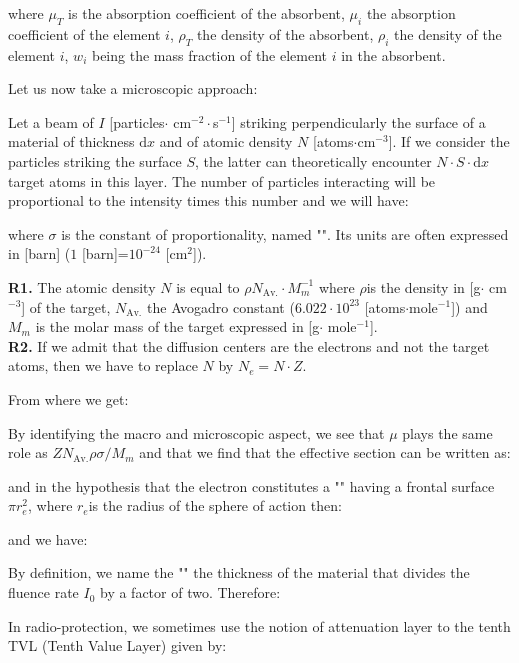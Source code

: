 	where $\mu_T$ is the absorption coefficient of the absorbent, $\mu_i$ the absorption coefficient of the element $i$, $\rho_T$ the density of the absorbent, $\rho_i$ the density of the element $i$, $w_i$ being the mass fraction of the element $i$ in the absorbent.

	Let us now take a microscopic approach:
	
	Let a beam of $I$ [particles$\cdot$ cm$^{-2}\cdot$s$^{-1}$] striking perpendicularly the surface of a material of thickness $\mathrm{d}x$ and of atomic density $N$ [atoms$\cdot$cm$^{-3}$]. If we consider the particles striking the surface $S$, the latter can theoretically encounter $N\cdot S\cdot \mathrm{d}x$ target atoms in this layer. The number of particles interacting will be proportional to the intensity times this number and we will have:
	
	where $\sigma$ is the constant of proportionality, named "". Its units are often expressed in [barn] ($1$ [barn]=$10^{-24}$ [cm$^2$]). 
	\begin{tcolorbox}[title=Remarks,colframe=black,arc=10pt]
	\textbf{R1.} The atomic density $N$ is equal to $\rho N_\text{Av.}\cdot M_m^{-1}$ where $\rho $is the density in [g$\cdot$ cm$^{-3}$] of the target, $N_\text{Av.}$ the Avogadro constant ($6.022\cdot 10^{23}$ [atoms$\cdot$mole$^{-1}$]) and $M_m$ is the molar mass of the target expressed in [g$\cdot$ mole$^{-1}$].\\

	\textbf{R2.} If we admit that the diffusion centers are the electrons and not the target atoms, then we have to replace $N$ by $N_e=N\cdot Z$.
	\end{tcolorbox}
	From where we get:
	
	By identifying the macro and microscopic aspect, we see that $\mu$ plays the same role as $ZN_\text{Av.}\rho\sigma/M_m$ and that we find that the effective section can be written as:
	
	and in the hypothesis that the electron constitutes a "" having a frontal surface $\pi r_e^2$, where $r_e$is the radius of the sphere of action then:
	
	and we have:
	
	By definition, we name the ""  the thickness of the material that divides the fluence rate $I_0$ by a factor of two. Therefore:
	
	In radio-protection, we sometimes use the notion of attenuation layer to the tenth TVL (Tenth Value Layer) given by:
	
